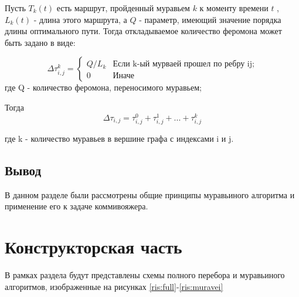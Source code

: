 \documentclass[a4paper,12pt]{report}
\begin{document}
   			Пусть $T _{k} (t)$ есть маршрут, пройденный муравьем $k$ к моменту времени $t$ , $L _{k} (t)$ - длина этого маршрута, а $Q$ - параметр, имеющий значение порядка длины оптимального пути. Тогда откладываемое количество феромона может быть задано в виде:
   			
   			\begin{equation}\label{form:add} 
   			{\displaystyle \Delta \tau _{i,j}^k={\begin{cases}Q/L_{k}& {\mbox{Если k-ый мурваей прошел по ребру ij;}}\\0&{\mbox{Иначе}}\end{cases}}}
   			\end{equation}
   			где \quad Q - количество феромона, переносимого муравьем;
   			
   			Тогда
   			\begin{equation}\label{form:add1} 
   			\Delta \tau _{i,j}= \tau _{i,j}^0 + \tau _{i,j}^1 + ... + \tau _{i,j}^k 
   			\end{equation}
   			
   			где k - количество муравьев в вершине графа с индексами i и j.

	\section{Вывод}

    		В данном разделе были рассмотрены общие принципы муравьиного алгоритма и применение его к задаче коммивояжера. 

    \newpage

    \chapter{Конструкторская часть}
        \label{sec:construct_part}
 
        	В рамках раздела будут представлены схемы полного перебора и муравьиного алгоритмов, изображенные на рисунках \ref{ris:full}-\ref{ris:muravei}
\end{document}
